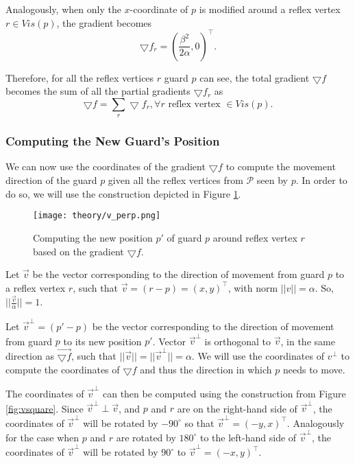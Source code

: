 Analogously, when only the $x$-coordinate of $p$ is modified around a reflex vertex $r \in Vis(p)$, the gradient becomes $$\bigtriangledown f_r = (\frac{\beta^2}{2\alpha}, 0)^\intercal.$$

Therefore, for all the reflex vertices $r$ guard $p$ can see, the total gradient $\bigtriangledown f$ becomes the sum of all the partial gradients $\bigtriangledown f_r$ as $$\bigtriangledown f = \sum_r \bigtriangledown f_r, \forall r \text{ reflex vertex } \in Vis(p).$$

\subsubsection{Computing the New Guard's Position}
We can now use the coordinates of the gradient $\bigtriangledown f$ to compute the movement direction of the guard $p$ given all the reflex vertices from $\mathcal P$ seen by $p$. In order to do so, we will use the construction depicted in Figure \ref{fig:vperp}. 

\begin{figure}[h!]
    \centering
    \texttt{[image: theory/v\_perp.png]}
    \caption{Computing the new position $p'$ of guard $p$ around reflex vertex $r$ based on the gradient $\bigtriangledown f$.}
    \label{fig:vperp}
\end{figure}

Let $\vec v$ be the vector corresponding to the direction of movement from guard $p$ to a reflex vertex $r$, such that $\vec{v} = (r - p) = (x, y)^\intercal$, with norm $||v|| = \alpha$. So, $||\frac{\vec v}{\alpha}|| = 1$.

Let $\vec{v}^\perp  = (p' - p)$ be the vector corresponding to the direction of movement from guard $p$ to its new position $p'$. Vector $\vec v^\perp$ is orthogonal to $\vec{v}$, in the same direction as $\vec{\bigtriangledown f}$, such that $||\vec{v}|| = ||\vec{v}^\perp|| = \alpha$. We will use the coordinates of $v^\perp$ to compute the coordinates of $\bigtriangledown f$ and thus the direction in which $p$ needs to move.

The coordinates of $\vec v^\perp$ can then be computed using the construction from Figure \ref{fig:vsquare}. Since $\vec v^\perp \perp \vec v$, and $p$ and $r$ are on the right-hand side of $\vec v^\perp$, the coordinates of $\vec v^\perp$ will be rotated by $-90^\circ$ so that $\vec v^\perp = (-y, x)^\intercal$. Analogously for the case when $p$ and $r$ are rotated by $180^\circ$ to the left-hand side of $\vec v^\perp$, the coordinates of $\vec v^\perp$ will be rotated by $90^\circ$ to $\vec v^\perp = (-x, y)^\intercal$.


